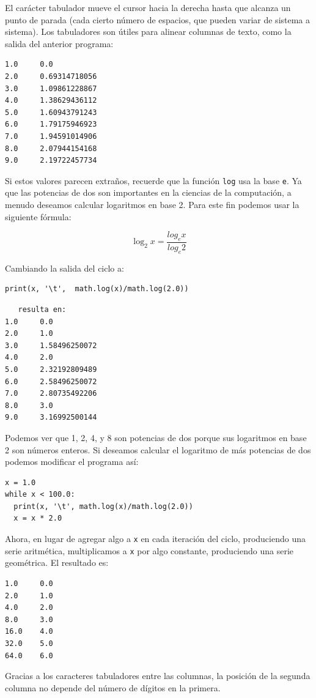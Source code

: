 El carácter tabulador mueve el cursor hacia la derecha hasta que alcanza
un punto de parada (cada cierto número de espacios, que pueden variar
de sistema a sistema). Los tabuladores son útiles para alinear columnas
de texto, como la salida del anterior programa:
\begin{verbatim}
1.0     0.0
2.0     0.69314718056
3.0     1.09861228867
4.0     1.38629436112
5.0     1.60943791243
6.0     1.79175946923
7.0     1.94591014906
8.0     2.07944154168
9.0     2.19722457734
\end{verbatim}
Si estos valores parecen extraños, recuerde que la función \texttt{log}
usa la base \texttt{e}. Ya que las potencias de dos son importantes
en la ciencias de la computación, a menudo deseamos calcular logaritmos
en base 2. Para este fin podemos usar la siguiente fórmula:

\begin{equation}
\log_{2}x=\frac{log_{e}x}{log_{e}2}
\end{equation}

Cambiando la salida del ciclo a:
\begin{verbatim}
print(x, '\t',  math.log(x)/math.log(2.0))
\end{verbatim}
\begin{verbatim}
   resulta en:
1.0     0.0
2.0     1.0
3.0     1.58496250072
4.0     2.0
5.0     2.32192809489
6.0     2.58496250072
7.0     2.80735492206
8.0     3.0
9.0     3.16992500144
\end{verbatim}
Podemos ver que 1, 2, 4, y 8 son potencias de dos porque sus logaritmos
en base 2 son números enteros. Si deseamos calcular el logaritmo de
más potencias de dos podemos modificar el programa así:
\begin{verbatim}
x = 1.0
while x < 100.0:
  print(x, '\t', math.log(x)/math.log(2.0))
  x = x * 2.0
\end{verbatim}

Ahora, en lugar de agregar algo a \texttt{x} en cada iteración del
ciclo, produciendo una serie aritmética, multiplicamos a \texttt{x}
por algo constante, produciendo una serie geométrica. El resultado
es:

 
\begin{verbatim}
1.0     0.0
2.0     1.0
4.0     2.0
8.0     3.0
16.0    4.0
32.0    5.0
64.0    6.0
\end{verbatim}
Gracias a los caracteres tabuladores entre las columnas, la posición
de la segunda columna no depende del número de dígitos en la primera.

